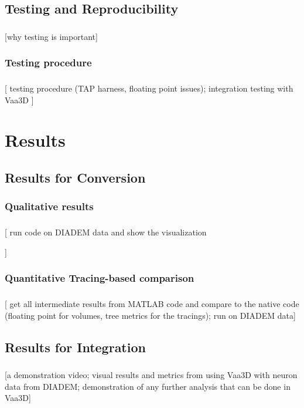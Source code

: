 \documentclass{beamer}
\newcommand{\tmetrics}[1]{#1}
\newcommand{\tmetrics}[1]{\textcolor{tmetrics}{#1}}
\begin{document}
\subsection{Testing and Reproducibility}
\begin{frame}\frametitle{\subsecname}
	[\tmetrics{why testing is important}]
\end{frame}

\subsubsection{Testing procedure}
\begin{frame}\frametitle{\subsubsecname}
	[
		testing procedure (TAP harness, floating point
		issues); integration testing with Vaa3D
	]
\end{frame}

\section{Results}

\subsection{Results for Conversion}

\subsubsection{Qualitative results}
\begin{frame}\frametitle{\subsecname}
	[
		\tmetrics{%
			run code on DIADEM data and show the
			visualization
		}
	]
\end{frame}

\subsubsection{Quantitative Tracing-based comparison}
\begin{frame}\frametitle{\subsecname}
	[ get all intermediate results from MATLAB code and
	compare to the native code (floating point for volumes,
	tree metrics for the tracings); run on DIADEM data]
\end{frame}

\subsection{Results for Integration}
\begin{frame}\frametitle{\subsecname}
	[\tmetrics{a demonstration video; visual results and metrics from using
			Vaa3D with neuron data from DIADEM; demonstration of any further analysis
	that can be done in Vaa3D}]

\end{frame}
\end{document}
